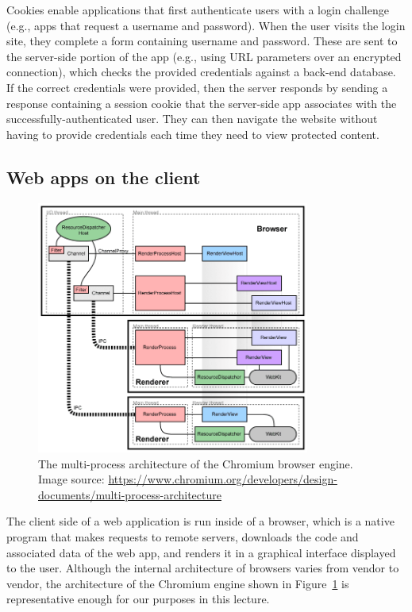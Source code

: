 \documentclass[11pt,twoside]{scrartcl}
\begin{document}
Cookies enable applications that first authenticate users with a login challenge (e.g., apps that request a username and password). When the user visits the login site, they complete a form containing username and password. These are sent to the server-side portion of the app (e.g., using URL parameters over an encrypted connection), which checks the provided credentials against a back-end database. If the correct credentials were provided, then the server responds by sending a response containing a session cookie that the server-side app associates with the successfully-authenticated user. They can then navigate the website without having to provide credentials each time they need to view protected content.

\subsection{Web apps on the client}

\begin{figure}
\centering
\includegraphics[width=0.8\textwidth]{arch.png}

\caption{\label{fig:chromium} The multi-process architecture of the Chromium browser engine. Image source: \url{https://www.chromium.org/developers/design-documents/multi-process-architecture}}
\end{figure}

The client side of a web application is run inside of a browser, which is a native program that makes requests to remote servers, downloads the code and associated data of the web app, and renders it in a graphical interface displayed to the user. Although the internal architecture of browsers varies from vendor to vendor, the architecture of the Chromium engine shown in Figure~\ref{fig:chromium} is representative enough for our purposes in this lecture. 
\end{document}

